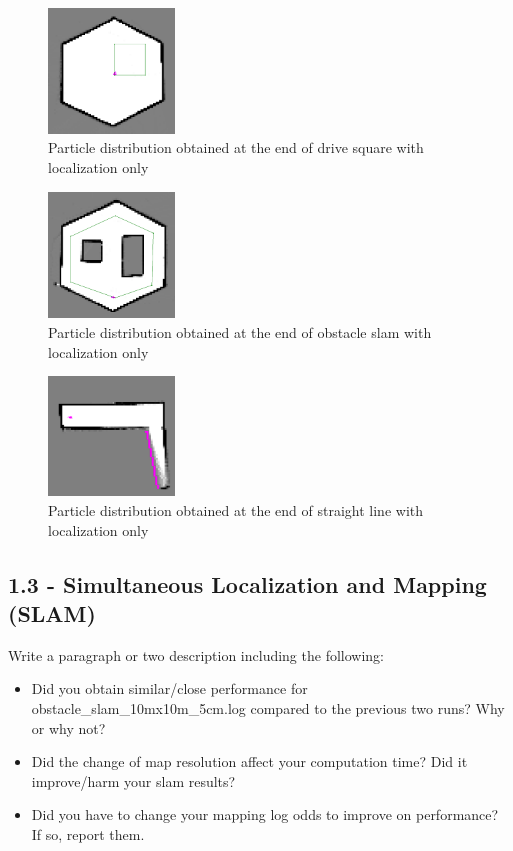 \documentclass[journal,twocolumn]{IEEEtran}
\begin{document}
\begin{figure}[H]
\centering
\includegraphics[width=0.3\textwidth]{Media/1221.png}
\caption{Particle distribution obtained at the end of drive square with localization only}
\end{figure}

\begin{figure}[H]
\centering
\includegraphics[width=0.3\textwidth]{Media/1222.png}
\caption{Particle distribution obtained at the end of obstacle slam with localization only}
\end{figure}


\begin{figure}[H]
\centering
\includegraphics[width=0.3\textwidth]{Media/1223.png}
\caption{Particle distribution obtained at the end of straight line with localization only}
\end{figure}

\subsection*{1.3 - Simultaneous Localization and Mapping (SLAM)} 

 Write a paragraph or two description including the following:
 \begin{itemize}
    \item Did you obtain similar/close performance for obstacle\_slam\_10mx10m\_5cm.log compared to the previous two runs? Why or why not?
    \item Did the change of map resolution affect your computation time? Did it improve/harm your slam results?
    \item Did you have to change your mapping log odds to improve on performance? If so, report them.
\end{itemize}
\end{document}
